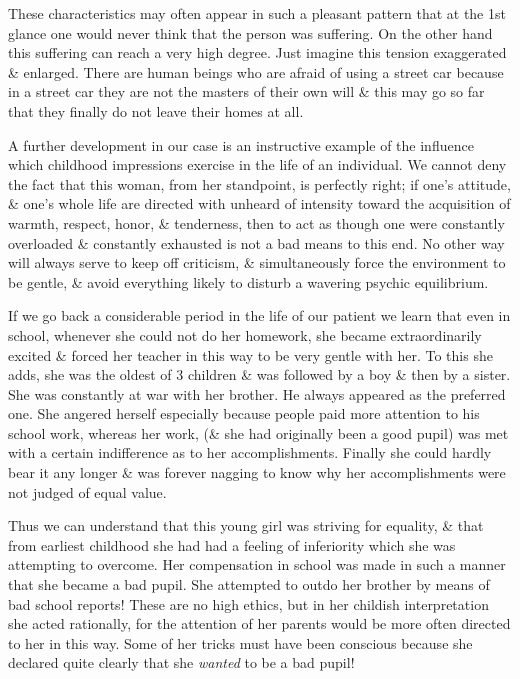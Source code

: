 \documentclass{article}
\begin{document}
These characteristics may often appear in such a pleasant pattern that at the 1st glance one would never think that the person was suffering. On the other hand this suffering can reach a very high degree. Just imagine this tension exaggerated \& enlarged. There are human beings who are afraid of using a street car because in a street car they are not the masters of their own will \& this may go so far that they finally do not leave their homes at all.

A further development in our case is an instructive example of the influence which childhood impressions exercise in the life of an individual. We cannot deny the fact that this woman, from her standpoint, is perfectly right; if one's attitude, \& one's whole life are directed with unheard of intensity toward the acquisition of warmth, respect, honor, \& tenderness, then to act as though one were constantly overloaded \& constantly exhausted is not a bad means to this end. No other way will always serve to keep off criticism, \& simultaneously force the environment to be gentle, \& avoid everything likely to disturb a wavering psychic equilibrium.

If we go back a considerable period in the life of our patient we learn that even in school, whenever she could not do her homework, she became extraordinarily excited \& forced her teacher in this way to be very gentle with her. To this she adds, she was the oldest of 3 children \& was followed by a boy \& then by a sister. She was constantly at war with her brother. He always appeared as the preferred one. She angered herself especially because people paid more attention to his school work, whereas her work, (\& she had originally been a good pupil) was met with a certain indifference as to her accomplishments. Finally she could hardly bear it any longer \& was forever nagging to know why her accomplishments were not judged of equal value.

Thus we can understand that this young girl was striving for equality, \& that from earliest childhood she had had a feeling of inferiority which she was attempting to overcome. Her compensation in school was made in such a manner that she became a bad pupil. She attempted to outdo her brother by means of bad school reports! These are no high ethics, but in her childish interpretation she acted rationally, for the attention of her parents would be more often directed to her in this way. Some of her tricks must have been conscious because she declared quite clearly that she {\it wanted} to be a bad pupil!
\end{document}

